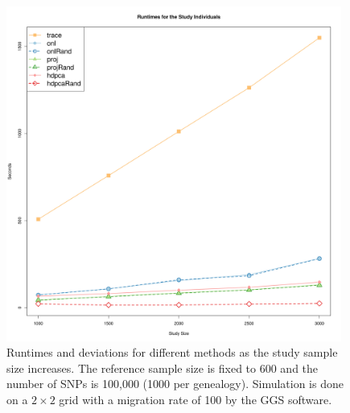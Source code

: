 \documentclass{article}
\begin{document}
\begin{figure}[p]
  \label{fig:mChg}
  \centering
  \includegraphics[width=0.98\textwidth]{mChg}
  \caption{
    Runtimes and deviations for different methods as the study sample size increases.
    The reference sample size is fixed to 600 and the number of SNPs is 100,000 (1000 per genealogy).
    Simulation is done on a $2 \times 2$ grid with a migration rate of 100 by the GGS software. 
  }
\end{figure}






\newpage
 

\newpage
\end{document}
